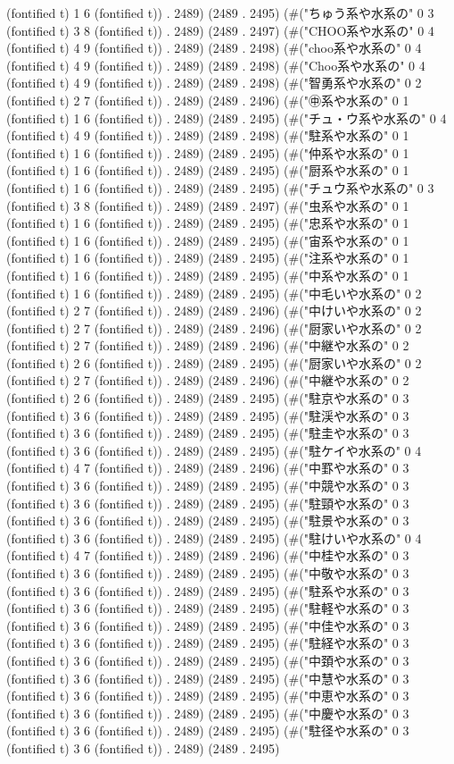 {(fontified t) 1 6 (fontified t)) . 2489) (2489 . 2495) (#("ちゅう系や水系の" 0 3 (fontified t) 3 8 (fontified t)) . 2489) (2489 . 2497) (#("CHOO系や水系の" 0 4 (fontified t) 4 9 (fontified t)) . 2489) (2489 . 2498) (#("choo系や水系の" 0 4 (fontified t) 4 9 (fontified t)) . 2489) (2489 . 2498) (#("Choo系や水系の" 0 4 (fontified t) 4 9 (fontified t)) . 2489) (2489 . 2498) (#("智勇系や水系の" 0 2 (fontified t) 2 7 (fontified t)) . 2489) (2489 . 2496) (#("㊥系や水系の" 0 1 (fontified t) 1 6 (fontified t)) . 2489) (2489 . 2495) (#("チュ・ウ系や水系の" 0 4 (fontified t) 4 9 (fontified t)) . 2489) (2489 . 2498) (#("駐系や水系の" 0 1 (fontified t) 1 6 (fontified t)) . 2489) (2489 . 2495) (#("仲系や水系の" 0 1 (fontified t) 1 6 (fontified t)) . 2489) (2489 . 2495) (#("厨系や水系の" 0 1 (fontified t) 1 6 (fontified t)) . 2489) (2489 . 2495) (#("チュウ系や水系の" 0 3 (fontified t) 3 8 (fontified t)) . 2489) (2489 . 2497) (#("虫系や水系の" 0 1 (fontified t) 1 6 (fontified t)) . 2489) (2489 . 2495) (#("忠系や水系の" 0 1 (fontified t) 1 6 (fontified t)) . 2489) (2489 . 2495) (#("宙系や水系の" 0 1 (fontified t) 1 6 (fontified t)) . 2489) (2489 . 2495) (#("注系や水系の" 0 1 (fontified t) 1 6 (fontified t)) . 2489) (2489 . 2495) (#("中系や水系の" 0 1 (fontified t) 1 6 (fontified t)) . 2489) (2489 . 2495) (#("中毛いや水系の" 0 2 (fontified t) 2 7 (fontified t)) . 2489) (2489 . 2496) (#("中けいや水系の" 0 2 (fontified t) 2 7 (fontified t)) . 2489) (2489 . 2496) (#("厨家いや水系の" 0 2 (fontified t) 2 7 (fontified t)) . 2489) (2489 . 2496) (#("中継や水系の" 0 2 (fontified t) 2 6 (fontified t)) . 2489) (2489 . 2495) (#("厨家いや水系の" 0 2 (fontified t) 2 7 (fontified t)) . 2489) (2489 . 2496) (#("中継や水系の" 0 2 (fontified t) 2 6 (fontified t)) . 2489) (2489 . 2495) (#("駐京や水系の" 0 3 (fontified t) 3 6 (fontified t)) . 2489) (2489 . 2495) (#("駐渓や水系の" 0 3 (fontified t) 3 6 (fontified t)) . 2489) (2489 . 2495) (#("駐圭や水系の" 0 3 (fontified t) 3 6 (fontified t)) . 2489) (2489 . 2495) (#("駐ケイや水系の" 0 4 (fontified t) 4 7 (fontified t)) . 2489) (2489 . 2496) (#("中罫や水系の" 0 3 (fontified t) 3 6 (fontified t)) . 2489) (2489 . 2495) (#("中競や水系の" 0 3 (fontified t) 3 6 (fontified t)) . 2489) (2489 . 2495) (#("駐頸や水系の" 0 3 (fontified t) 3 6 (fontified t)) . 2489) (2489 . 2495) (#("駐景や水系の" 0 3 (fontified t) 3 6 (fontified t)) . 2489) (2489 . 2495) (#("駐けいや水系の" 0 4 (fontified t) 4 7 (fontified t)) . 2489) (2489 . 2496) (#("中桂や水系の" 0 3 (fontified t) 3 6 (fontified t)) . 2489) (2489 . 2495) (#("中敬や水系の" 0 3 (fontified t) 3 6 (fontified t)) . 2489) (2489 . 2495) (#("駐系や水系の" 0 3 (fontified t) 3 6 (fontified t)) . 2489) (2489 . 2495) (#("駐軽や水系の" 0 3 (fontified t) 3 6 (fontified t)) . 2489) (2489 . 2495) (#("中佳や水系の" 0 3 (fontified t) 3 6 (fontified t)) . 2489) (2489 . 2495) (#("駐経や水系の" 0 3 (fontified t) 3 6 (fontified t)) . 2489) (2489 . 2495) (#("中頚や水系の" 0 3 (fontified t) 3 6 (fontified t)) . 2489) (2489 . 2495) (#("中慧や水系の" 0 3 (fontified t) 3 6 (fontified t)) . 2489) (2489 . 2495) (#("中恵や水系の" 0 3 (fontified t) 3 6 (fontified t)) . 2489) (2489 . 2495) (#("中慶や水系の" 0 3 (fontified t) 3 6 (fontified t)) . 2489) (2489 . 2495) (#("駐径や水系の" 0 3 (fontified t) 3 6 (fontified t)) . 2489) (2489 . 2495) }
